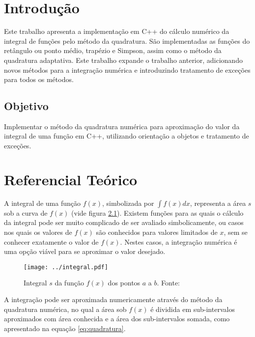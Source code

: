 
\chapter{Introdução}

Este trabalho apresenta a implementação em C++ do cálculo numérico da integral de funções pelo método da quadratura. São implementadas as funções do retângulo ou ponto médio, trapézio e Simpson, assim como o método da quadratura adaptativa. Este trabalho expande o trabalho anterior, adicionando novos métodos para a integração numérica e introduzindo tratamento de exceções para todos os métodos.

\section{Objetivo}

Implementar o método da quadratura numérica para aproximação do valor da integral de uma função em C++, utilizando orientação a objetos e tratamento de exceções.

\chapter{Referencial Teórico}

A integral de uma função \(f(x)\), simbolizada por \(\int f(x)dx\), representa a área \(s\) sob a curva de \(f(x)\) (vide figura \ref{fig:integral}). Existem funções para as quais o cálculo da integral pode ser muito complicado de ser avaliado simbolicamente, ou casos nos quais os valores de \(f(x)\) são conhecidos para valores limitados de \(x\), sem se conhecer exatamente o valor de \(f(x)\). Nestes casos, a integração numérica é uma opção viável para se aproximar o valor desejado.

\begin{figure}
  \centering
  \texttt{[image: ../integral.pdf]}
  \caption[Integral \(s\) da função \(f(x)\) dos pontos \(a\) a \(b\).]{Integral \(s\) da função \(f(x)\) dos pontos \(a\) a \(b\). Fonte: \protect\cite{wiki:numeint}}
  \label{fig:integral}
\end{figure}

A integração pode ser aproximada numericamente através do método da quadratura numérica, no qual a área sob \(f(x)\) é dividida em sub-intervalos aproximados com área conhecida e a área dos sub-intervalos somada, como apresentado na equação \eqref{eq:quadratura}.

